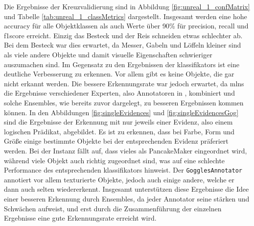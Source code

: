 Die Ergebnisse der Kreuzvalidierung sind in Abbildung \ref{fig:unreal_1_confMatrix} und Tabelle \ref{tab:unreal_1_classMetrics} dargestellt. Insgesamt werden eine hohe \gls{accuracy} für alle Objektklassen als auch Werte über 90\% für \gls{precision}, \gls{recall} und \gls{f1score} erreicht. Einzig das Besteck und der Reis schneiden etwas schlechter ab. Bei dem Besteck war dies erwartet, da Messer, Gabeln und Löffeln kleiner sind als viele andere Objekte und damit visuelle Eigenschaften schwieriger auszumachen sind. Im Gegensatz zu den Ergebnissen der \glspl{klassifikator} ist eine deutliche Verbesserung zu erkennen. Vor allem gibt es keine Objekte, die gar nicht erkannt werden. Die bessere Erkennungsrate war jedoch erwartet, da \glspl{mln} die Ergebnisse verschiedener Experten, also Annotatoren in \robosherlock, kombiniert und solche Ensembles, wie bereits zuvor dargelegt, zu besseren Ergebnissen kommen können. \newline
In den Abbildungen \ref{fig:singleEvidences} und \ref{fig:singleEvidencesGog} sind die Ergebnisse der Erkennung mit nur jeweils einer Evidenz, also einem logischen Prädikat, abgebildet. Es ist zu erkennen, dass bei Farbe, Form und Größe einige bestimmte Objekte bei der entsprechenden Evidenz präferiert werden. Bei der Instanz fällt auf, dass vieles als PancakeMaker eingeordnet wird, während viele Objekt auch richtig zugeordnet sind, was auf eine schlechte Performance des entsprechenden \gls{klassifikator}s hinweist. Der \texttt{GogglesAnnotator} annotiert vor allem texturierte Objekte, jedoch auch einige andere, welche er dann auch selten wiedererkennt. Insgesamt unterstützen diese Ergebnisse die Idee einer besseren Erkennung durch Ensembles, da jeder Annotator seine stärken und Schwächen aufweist, und erst durch die Zusammenführung der einzelnen Ergebnisse eine gute Erkennungsrate erreicht wird.

